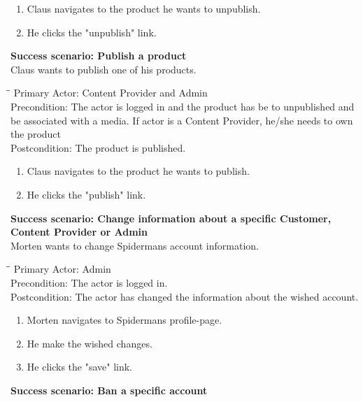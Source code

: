 \begin{enumerate} \setlength{\itemsep}{-1mm}
	\item Claus navigates to the product he wants to unpublish.
	\item He clicks the "unpublish" link.
\end{enumerate}
\vspace{3mm}
\textbf{Success scenario: Publish a product} \\
Claus wants to publish one of his products.
\begin{tabbing}
\hspace{5mm}\=\hspace{26mm}\=\kill
\>Primary Actor:\> Content Provider and Admin\\
\>Precondition:\> The actor is logged in and the product has be to unpublished and be associated with a media. If actor is a Content Provider, he/she needs to own the product\\
\>Postcondition:\> The product is published.
\end{tabbing}
\begin{enumerate} \setlength{\itemsep}{-1mm}
	\item Claus navigates to the product he wants to publish.
	\item He clicks the "publish" link.
\end{enumerate}
\vspace{3mm}
\textbf{Success scenario: Change information about a specific Customer, Content Provider or Admin} \\
Morten wants to change Spidermans account information.
\begin{tabbing}
\hspace{5mm}\=\hspace{26mm}\=\kill
\>Primary Actor:\> Admin\\
\>Precondition:\> The actor is logged in.\\
\>Postcondition:\> The actor has changed the information about the wished account.
\end{tabbing}
\begin{enumerate} \setlength{\itemsep}{-1mm}
	\item Morten navigates to Spidermans profile-page.
	\item He make the wished changes.
	\item He clicks the "save" link.
\end{enumerate}
\vspace{3mm}
\textbf{Success scenario: Ban a specific account} \\
